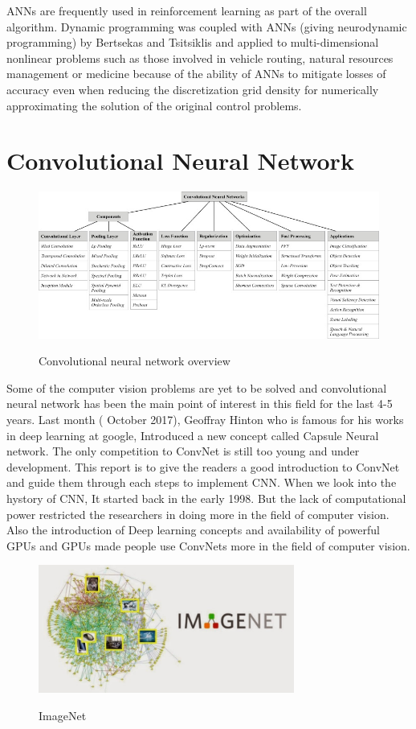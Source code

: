 \documentclass[12pt]{article}
\begin{document}
        ANNs are frequently used in reinforcement learning as part of the overall algorithm. Dynamic programming was coupled with ANNs (giving neurodynamic programming) by Bertsekas and Tsitsiklis and applied to multi-dimensional nonlinear problems such as those involved in vehicle routing, natural resources management or medicine because of the ability of ANNs to mitigate losses of accuracy even when reducing the discretization grid density for numerically approximating the solution of the original control problems.
\section{\fontsize{14}{14}\selectfont Convolutional Neural Network}
\begin{figure}[h]
    	\centering
    	\includegraphics[width=1\textwidth]{cnn1.jpg}
       	\label{fig:mesh5}
	\caption{Convolutional neural network overview}
	\end{figure} 

    Some of the computer vision problems are yet to be solved and convolutional neural network has been the main point of interest in this field for the last 4-5 years. Last month ( October 2017), Geoffray Hinton who is famous for his works in deep learning at google, Introduced a new concept called Capsule Neural network. The only competition to ConvNet is still too young and under development. This report is to give the readers a good introduction to ConvNet and guide them through each steps to implement CNN. When we look into the hystory of CNN, It started back in the early 1998. But the lack of computational power restricted the researchers in doing more in the field of computer vision. Also the introduction of Deep learning concepts and availability of powerful GPUs and GPUs made people use ConvNets more in the field of computer vision. 

\begin{figure}[h]
    	\centering
    	\includegraphics[width=0.75\textwidth]{e.jpg}
       	\label{fig:mesh6}
	\caption{ImageNet}
	\end{figure} 
    
\end{document}
